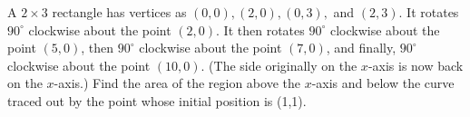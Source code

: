 A $2 \times 3$ rectangle has vertices as $(0, 0), (2,0), (0,3),$ and $(2,
3)$. It rotates $90^\circ$ clockwise about the point $(2, 0)$. It then
rotates $90^\circ$ clockwise about the point $(5, 0)$, then $90^\circ$
clockwise about the point $(7, 0)$, and finally, $90^\circ$ clockwise
about the point $(10, 0)$. (The side originally on the $x$-axis is now
back on the $x$-axis.) Find the area of the region above the $x$-axis and
below the curve traced out by the point whose initial position is (1,1).
